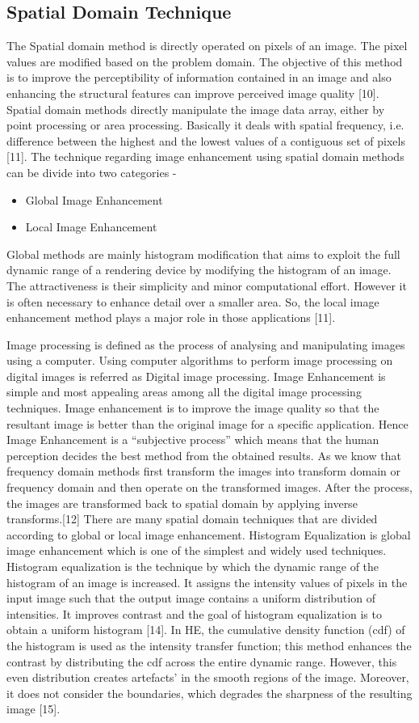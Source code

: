 \subsection{Spatial Domain Technique}
The Spatial domain method is directly operated on pixels of an image. The pixel values are modified based on the problem domain. The objective of this method is to improve the perceptibility of information contained in an image and also enhancing the structural features can improve perceived image quality [10]. Spatial domain methods directly manipulate the image data array, either by point processing or area processing. Basically it deals with spatial frequency, i.e. difference between the highest and the lowest values of a contiguous set of pixels [11]. The technique regarding image enhancement using spatial domain methods can be divide into two categories -
	\begin{itemize}
		\item Global Image Enhancement
		\item Local Image Enhancement
	
	\end{itemize}
Global methods are mainly histogram modification that aims to exploit the full dynamic range of a rendering device by modifying the histogram of an image. The attractiveness is their simplicity and minor computational effort. However it is often necessary to enhance detail over a smaller area. So, the local image enhancement method plays a major role in those applications [11].\par 
Image processing is defined as the process of analysing and manipulating images using a computer. Using computer algorithms to perform image processing on digital images is referred as Digital image processing. Image Enhancement is simple and most appealing areas among all the digital image processing techniques. Image enhancement is to improve the image quality so that the resultant image is better than the original image for a specific application. Hence Image Enhancement is a “subjective process” which means that the human perception decides the best method from the obtained results. As we know that frequency domain methods first transform the images into transform domain or frequency domain and then operate on the transformed images. After the process, the images are transformed back to spatial domain by applying inverse transforms.[12]
There are many spatial domain techniques that are divided according to global or local image enhancement. Histogram Equalization is global image enhancement which is one of the simplest and widely used techniques. Histogram equalization is the technique by which the dynamic range of the histogram of an image is increased. It assigns the intensity values of pixels in the input image such that the output image contains a uniform distribution of intensities. It improves contrast and the goal of histogram equalization is to obtain a uniform histogram [14]. In HE, the cumulative density function (cdf) of the histogram is used as the intensity transfer function; this method enhances the contrast by distributing the cdf across the entire dynamic range. However, this even distribution creates artefacts’ in the smooth regions of the image. Moreover, it does not consider the boundaries, which degrades the sharpness of the resulting image [15].
